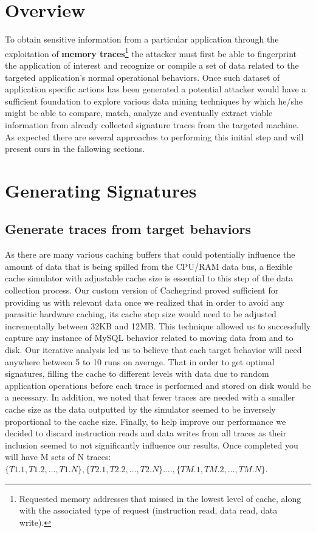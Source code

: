 \documentclass[11pt,a4paper, titlepage, oneside]{article}
\begin{document}
\section{Overview}
To obtain sensitive information from a particular application through the exploitation of \textbf{memory traces}\footnote{Requested memory addresses that missed in the lowest level of cache, along with the associated type of request (instruction read, data read, data write).} the attacker must first be able to fingerprint the application of interest and recognize or compile a set of data related to the targeted application's normal operational behaviors. Once such dataset of application specific actions has been generated a potential attacker would have a sufficient foundation to explore various data mining techniques by which he/she might be able to compare, match, analyze and eventually extract viable information from already collected signature traces from the targeted machine. As expected there are several approaches to performing this initial step and will present ours in the fallowing sections.

\section{Generating Signatures}
\subsection{Generate traces from target behaviors}
As there are many various caching buffers that could potentially influence the amount of data that is being spilled from the CPU/RAM data bus, a flexible cache simulator with adjustable cache size is essential to this step of the data collection process. Our custom version of Cachegrind proved sufficient for providing us with relevant data once we realized that in order to avoid any parasitic hardware caching, its cache step size would need to be adjusted incrementally between 32KB and 12MB. This technique allowed us to successfully capture any instance of MySQL behavior related to moving data from and to disk.  Our iterative analysis led us to believe that each target behavior will need anywhere between 5 to 10 runs on average. That in order to get optimal signatures, filling the cache to different levels with data due to random application operations before each trace is performed and stored on disk would be a necessary. In addition, we noted that fewer traces are needed with a smaller cache size as the data outputted by the simulator seemed to be inversely proportional to the cache size. Finally, to help improve our performance we decided to discard instruction reads and data writes from all traces as their inclusion seemed to not significantly influence our results.
Once completed you will have M sets of N traces: \\$\{T1.1, T1.2, \ldots, T1.N\}, \{T2.1, T2.2, \ldots, T2.N\}. \ldots, \{TM.1, TM.2, \ldots, TM.N\}$.
\end{document}
